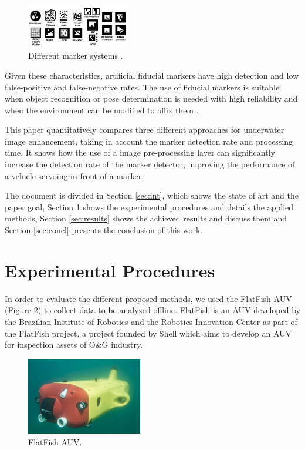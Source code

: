 \documentclass[conference, letterpaper]{IEEEtran}
\begin{document}
\begin{figure}[!ht]
	\centering
    \includegraphics[width=0.40\textwidth]{./fig/marker_systems.png}
    \caption[Different marker systems]{Different marker systems \cite{Fiala2010}.}
	\label{fig:marker_systems}
\end{figure}

Given these characteristics, artificial fiducial markers have high detection
and low false-positive and false-negative rates. The use of fiducial markers is
suitable when object recognition or pose determination is needed with high
reliability and when the environment can be modified to affix them \cite{Fiala2010}. 

This paper quantitatively compares three different approaches for underwater
image enhancement, taking in account the marker detection rate and processing
time. It shows how the use of a image pre-processing layer can significantly
increase the detection rate of the marker detector, improving the performance
of a vehicle servoing in front of a marker.

The document is divided in Section \ref{sec:int}, which shows the state of art
and the paper goal, Section \ref{sec:exp_proced} shows the experimental
procedures and details the applied methods, Section \ref{sec:results} shows the
achieved results and discuss them and Section \ref{sec:concl} presents the
conclusion of this work. 


\section{Experimental Procedures} \label{sec:exp_proced}

In order to evaluate the different proposed methods, we used the FlatFish AUV (Figure
\ref{fig:flatfish_1}) \cite{flatfish_jan} to collect data to be analyzed
offline. FlatFish is an AUV developed by the Brazilian Institute of Robotics
and the Robotics Innovation Center as part of the FlatFish project, a project
founded by Shell which aims to develop an AUV for inspection assets of O\&G industry.

\begin{figure}[!ht]
    \centering
    \includegraphics[width=0.45\textwidth]{./fig/20160317-FF-Test-P1040442.jpg}
    \caption{FlatFish AUV.}
    \label{fig:flatfish_1}
\end{figure}
\end{document}
